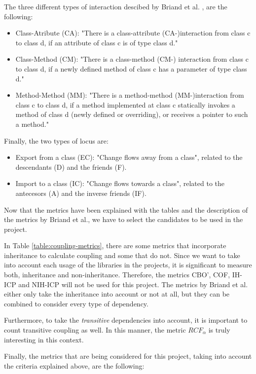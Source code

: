 \bigskip\noindent
The three different types of interaction descibed by Briand et al. \cite{briand1997investigation}, are the following:
\begin{itemize}
    \item Class-Atribute (CA): "There is a class-attribute (CA-)interaction from class c to class d, if an attribute of class c is of type class d."
    \item Class-Method (CM): "There is a class-method (CM-) interaction from class c to class d, if a newly defined method of class c has a parameter of type class d."
    \item Method-Method (MM): "There is a method-method (MM-)interaction from class c to class d, if a method implemented at class c statically invokes a method of class d (newly defined or overriding), or receives a pointer to such a method."
\end{itemize}

\bigskip\noindent
Finally, the two types of locus are:
\begin{itemize}
  \item Export from a class (EC): "Change flows away from a class", related to the descendants (D) and the friends (F).
  \item Import to a class (IC): "Change flows towards a class", related to the antecesors (A) and the inverse friends (IF).
\end{itemize}

\bigskip\noindent
Now that the metrics have been explained with the tables and the description of the metrics by Briand et al., we have to select the candidates to be used in the project.

In Table \ref{table:coupling-metrics}, there are some metrics that incorporate inheritance to calculate coupling and some that do not.
Since we want to take into account each usage of the libraries in the projects, it is significant to measure both, inheritance and non-inheritance.
Therefore, the metrics CBO', COF, IH-ICP and NIH-ICP will not be used for this project. The metrics by Briand et al. either only take the inheritance into account or not at all, but they can be combined to consider every type of dependency.

Furthermore, to take the \textit{transitive} dependencies into account, it is important to count transitive coupling as well.
In this manner, the metric $RCF_\alpha$ is truly interesting in this context.

Finally, the metrics that are being considered for this project, taking into account the criteria explained above, are the following:

